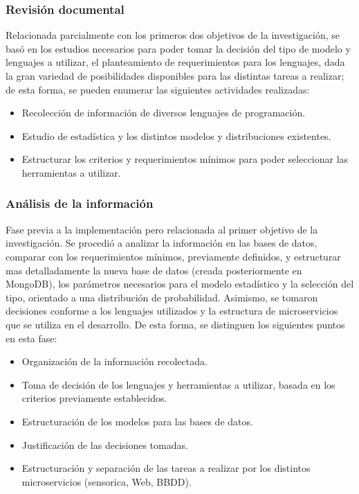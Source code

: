 \subsubsection{Revisión documental}
Relacionada parcialmente con los primeros dos objetivos de la investigación,
se basó en los estudios necesarios para poder tomar la decisión del tipo de modelo
y lenguajes a utilizar, el planteamiento de requerimientos para los
lenguajes, dada la gran variedad de posibilidades disponibles para las distintas
tareas a realizar; de esta forma, se pueden enumerar las siguientes actividades
realizadas:

\begin{itemize}
    \item Recolección de información de diversos lenguajes de programación.
    \item Estudio de estadística y los distintos modelos y distribuciones existentes.
    \item Estructurar los criterios y requerimientos mínimos para poder seleccionar
        las herramientas a utilizar.
\end{itemize}

\subsubsection{Análisis de la información}
Fase previa a la implementación pero relacionada al primer objetivo
de la investigación. Se procedió a analizar la información en las bases de datos,
comparar con los requerimientos mínimos, previamente definidos, y estructurar
mas detalladamente
la nueva base de datos (creada posteriormente en MongoDB), los parámetros
necesarios para el modelo estadístico y la selección del tipo, orientado a una
distribución de probabilidad. Asimismo, se tomaron decisiones conforme a los
lenguajes utilizados y la estructura de microservicios que se utiliza en el
desarrollo. De esta forma, se distinguen los siguientes puntos en esta fase:

\begin{itemize}
    \item Organización de la información recolectada.
    \item Toma de decisión de los lenguajes y herramientas a utilizar, basada
        en los criterios previamente establecidos.
    \item Estructuración de los modelos para las bases de datos.
    \item Justificación de las decisiones tomadas.
    \item Estructuración y separación de las tareas a realizar por los distintos
        microservicios (sensorica, Web, BBDD).
\end{itemize}

